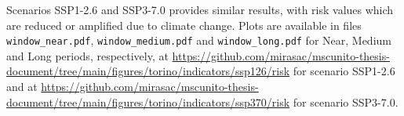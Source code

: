 Scenarios SSP1-2.6 and SSP3-7.0 provides similar results, with risk values which are reduced or amplified due to climate change. Plots are available in files \verb|window_near.pdf|, \verb|window_medium.pdf| and \verb|window_long.pdf| for Near, Medium and Long periods, respectively, at \url{https://github.com/mirasac/mscunito-thesis-document/tree/main/figures/torino/indicators/ssp126/risk} for scenario SSP1-2.6 and at \url{https://github.com/mirasac/mscunito-thesis-document/tree/main/figures/torino/indicators/ssp370/risk} for scenario SSP3-7.0.
